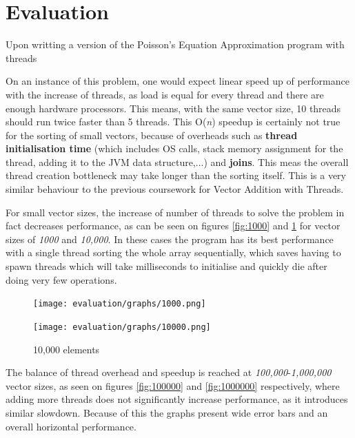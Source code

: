 \documentclass{article}
\begin{document}
\section{Evaluation}

\iffalse


  Upon writting a version of the Poisson's Equation Approximation program with threads
  
  On an instance of this problem, one would expect linear speed up of performance with the increase of threads, as load is equal for every thread and there are enough hardware processors. This means, with the same vector size, 10 threads should run twice faster than 5 threads. This O(\textit{n}) speedup is certainly not true for the sorting of small vectors, because of overheads such as \textbf{thread initialisation time} (which includes OS calls, stack memory assignment for the thread, adding it to the JVM data structure,...) and \textbf{joins}. This meas the overall thread creation bottleneck may take longer than the sorting itself. This is a very similar behaviour to the previous coursework for Vector Addition with Threads.

  For small vector sizes, the increase of number of threads to solve the problem in fact decreases performance, as can be seen on figures \ref{fig:1000} and \ref{fig:10000} for vector sizes of \textit{1000} and \textit{10,000}. In these cases the program has its best performance with a single thread sorting the whole array sequentially, which saves having to spawn threads which will take milliseconds to initialise and quickly die after doing very few operations.

  \begin{figure}
  \centering
  \begin{minipage}{0.45\textwidth}
    \caption{1,000 elements}
    \texttt{[image: evaluation/graphs/1000.png]}
    \label{fig:1000}
  \end{minipage}
  \begin{minipage}{0.45\textwidth}
    \caption{10,000 elements}
    \texttt{[image: evaluation/graphs/10000.png]}
    \label{fig:10000}
  \end{minipage}
  \end{figure}

  The balance of thread overhead and speedup is reached at \textit{100,000}-\textit{1,000,000} vector sizes, as seen on figures
  \ref{fig:100000} and \ref{fig:1000000} respectively, where adding more threads does not significantly increase performance, as it introduces similar slowdown. Because of this the graphs present wide error bars and an overall horizontal performance. 
\end{document}
